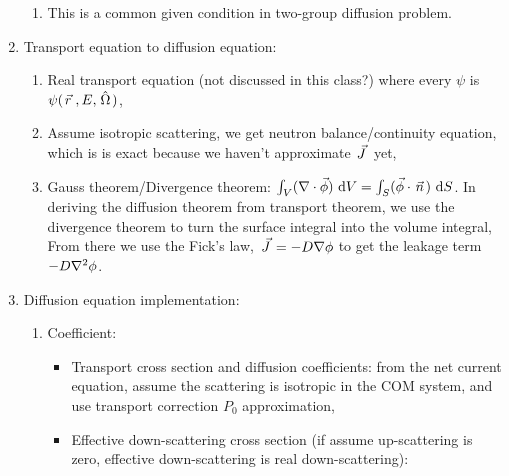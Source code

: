 \documentclass{school-22.211-notes}
\begin{document}
\begin{enumerate}
\begin{enumerate}
  \item {} This is a common given condition in two-group diffusion problem.
  \end{enumerate}


\item Transport equation to diffusion equation: 
  \begin{enumerate}
  \item Real transport equation (not discussed in this class?) where every $\psi$ is $\psi(\left.\vec{r}\right., E, \left. \hat{\Omega} \right.)$, 

    \item Assume isotropic scattering, we get neutron balance/continuity equation, which is is exact because we haven't approximate $\left.\vec{J}\right.$ yet, 

    \item Gauss theorem/Divergence theorem: $\int_V (\nabla \cdot \vec{\phi} ) \mbox{ }\mathrm{d} V = \int_S (\vec{\phi} \cdot \left.\vec{n}\right.) \mbox{ }\mathrm{d} S$. In deriving the diffusion theorem from transport theorem, we use the divergence theorem to turn the surface integral into the volume integral,
  From there we use the Fick's law, $\left.\vec{J}\right. = - D \nabla \phi$ to get the leakage term $-D \nabla^2 \phi$. 
  \end{enumerate}


\item Diffusion equation implementation: 
  \begin{enumerate}
  \item Coefficient: 
    \begin{itemize}
    \item Transport cross section and diffusion coefficients: from the net current equation, assume the scattering is isotropic in the COM system, and use transport correction $P_0$ approximation, 
    \item Effective down-scattering cross section (if assume up-scattering is zero, effective down-scattering is real down-scattering): 


\end{itemize}
\end{enumerate}
\end{enumerate}
\end{document}
